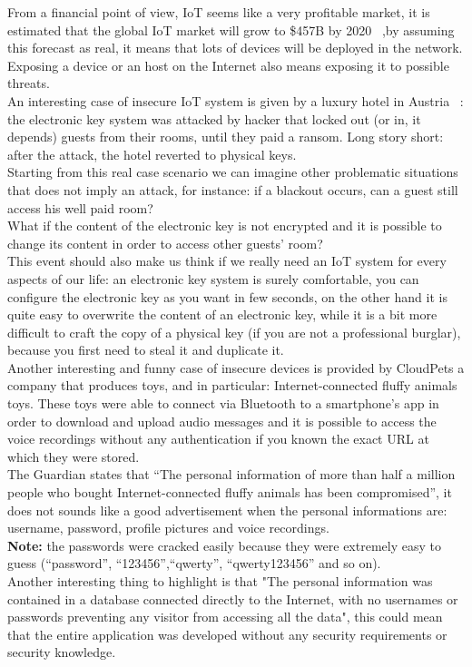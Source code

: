 	From a financial point of view, IoT seems like a very profitable market, it is estimated that the global IoT market will grow to \$457B by 2020 ~\cite{forbes},by assuming this forecast as real, it means that lots of devices will be deployed in the network. Exposing a device
	or an host on the Internet also means exposing it to possible threats.\\
	An interesting case of insecure IoT system is given by a luxury hotel in Austria ~\cite{whydoiot}: the electronic key system was attacked
	by hacker that locked out (or in, it depends) guests from their rooms, until they paid a ransom.
	Long story short: after the attack, the hotel reverted to physical keys.\\
	Starting from this real case scenario we can imagine other problematic situations that does not imply an attack, for instance: if a blackout occurs, can a guest still access his well paid room?\\
	What if the content of the electronic key is not encrypted and it is possible to change its content in order to access other guests' room?\\
	This event should also make us think if we really need an IoT system for every aspects of our life: an electronic key system is
	surely comfortable, you can configure the electronic key as you want in few seconds, on the other hand it is quite easy to overwrite the content
	of an electronic key, while it is a bit more difficult to craft the copy of a physical key (if you are not a professional burglar), because you first need to steal it and duplicate it.\\
	Another interesting and funny case of insecure devices is provided by CloudPets\cite{toys} a company that produces toys, and in particular: Internet-connected fluffy animals toys.
	These toys were able to connect via Bluetooth to a smartphone's app in order to download and upload audio messages and it is possible to access the voice recordings without any authentication if you known the exact URL at which they were stored.\\
	The Guardian states that ``The personal information of more than half a million people who bought Internet-connected fluffy animals has been compromised'', it does not sounds like a good advertisement
	when the personal informations are: username, password, profile pictures and voice recordings.\\
	\textbf{Note:} the passwords were cracked easily because they were extremely easy to guess (``password'', ``123456'',``qwerty'', ``qwerty123456'' and so on).\\
	Another interesting thing to highlight is that "The personal information was contained in a database connected directly to the Internet, with no usernames or passwords preventing any visitor from accessing all the data", this could mean that the entire application was developed without any security requirements or security knowledge.\\
	 
